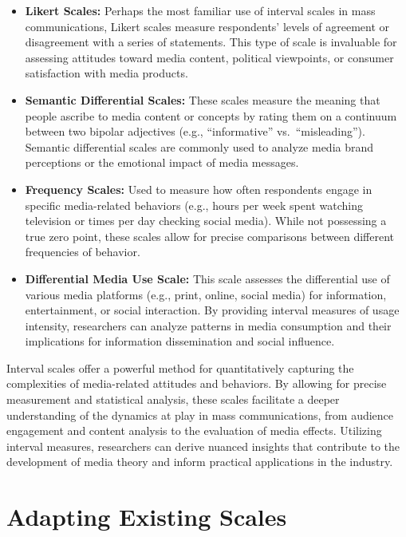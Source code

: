 \documentclass[
]{book}
\begin{document}
\begin{itemize}
\item
  \textbf{Likert Scales:} Perhaps the most familiar use of interval scales in mass communications, Likert scales measure respondents' levels of agreement or disagreement with a series of statements. This type of scale is invaluable for assessing attitudes toward media content, political viewpoints, or consumer satisfaction with media products.
\item
  \textbf{Semantic Differential Scales:} These scales measure the meaning that people ascribe to media content or concepts by rating them on a continuum between two bipolar adjectives (e.g., ``informative'' vs.~``misleading''). Semantic differential scales are commonly used to analyze media brand perceptions or the emotional impact of media messages.
\item
  \textbf{Frequency Scales:} Used to measure how often respondents engage in specific media-related behaviors (e.g., hours per week spent watching television or times per day checking social media). While not possessing a true zero point, these scales allow for precise comparisons between different frequencies of behavior.
\item
  \textbf{Differential Media Use Scale:} This scale assesses the differential use of various media platforms (e.g., print, online, social media) for information, entertainment, or social interaction. By providing interval measures of usage intensity, researchers can analyze patterns in media consumption and their implications for information dissemination and social influence.
\end{itemize}

Interval scales offer a powerful method for quantitatively capturing the complexities of media-related attitudes and behaviors. By allowing for precise measurement and statistical analysis, these scales facilitate a deeper understanding of the dynamics at play in mass communications, from audience engagement and content analysis to the evaluation of media effects. Utilizing interval measures, researchers can derive nuanced insights that contribute to the development of media theory and inform practical applications in the industry.

\hypertarget{adapting-existing-scales}{%
\section{Adapting Existing Scales}\label{adapting-existing-scales}}
\end{document}
